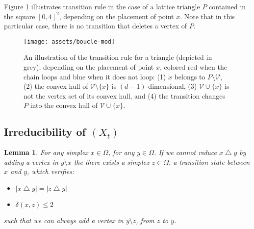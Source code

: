 \documentclass[a4paper]{article}
\newtheorem{lemma}{Lemma}
\begin{document}
Figure \ref{fig:boucle} illustrates transition rule in the case of a lattice triangle $P$ contained in the square $[0,4]^2$, depending on the placement of point $x$. Note that in this particular case, there is no transition that deletes a vertex of $P$.

\begin{figure}
  \begin{center}
    \texttt{[image: assets/boucle-mod]}
    \caption{An illustration of the transition rule for a triangle (depicted in grey), depending on the placement of point $x$, colored red when the chain loops and blue when it does not loop: (1) $x$ belongs to $P\mathord{\setminus}\mathcal{V}$, (2) the convex hull of $\mathcal{V}\mathord{\setminus}\{x\}$ is $(d-1)$-dimensional, (3) $\mathcal{V}\cup\{x\}$ is not the vertex set of its convex hull, and (4) the transition changes $P$ into the convex hull of $\mathcal{V}\cup\{x\}$.}
    \label{fig:boucle}
  \end{center}
\end{figure}

\subsection{Irreducibility of $(X_t)$}

\begin{lemma}\label{lem:elim-mauvais-cas}
  For any simplex $x \in \Omega$, for any $y \in \Omega$. If we cannot reduce $x \bigtriangleup y$ by adding a vertex in $y \setminus x$ the there exists a simplex $z \in \Omega$, a transition state between $x$ and $y$, which verifies:
  \begin{itemize}
    \item $|x \bigtriangleup y| = |z \bigtriangleup y|$
    \item $\delta(x,z)\leq{2}$
  \end{itemize}
  such that we can always add a vertex in $y \setminus z$, from $z$ to $y$.
\end{lemma}
\end{document}
